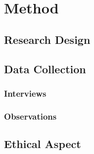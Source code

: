 \chapter{Method}

\section{Research Design}
\lipsum[30] %

\section{Data Collection}
\lipsum[33] %

\subsection{Interviews}
\lipsum[35] %

\subsection{Observations}
\lipsum[36] %

\section{Ethical Aspect}
\lipsum[41] %